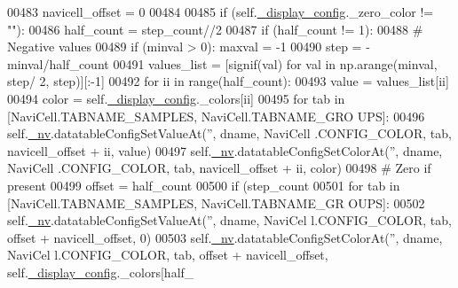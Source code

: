 \begin{DoxyCode}
00483                 navicell\_offset = 0
00484 
00485             \textcolor{keywordflow}{if} (self.\hyperlink{classnavicom_1_1navicom_1_1NaviCom_ab8ddca454f674629472d8bfec46ac76f}{_display_config}.\_zero\_color != \textcolor{stringliteral}{""}):
00486                 half\_count = step\_count//2
00487                 \textcolor{keywordflow}{if} (half\_count != 1):
00488                     \textcolor{comment}{# Negative values}
00489                     \textcolor{keywordflow}{if} (minval > 0): maxval = -1
00490                     step = -minval/half\_count
00491                     values\_list = [signif(val) \textcolor{keywordflow}{for} val \textcolor{keywordflow}{in} np.arange(minval, step/
      2, step)][:-1]
00492                     \textcolor{keywordflow}{for} ii \textcolor{keywordflow}{in} range(half\_count):
00493                        value = values\_list[ii]
00494                        color = self.\hyperlink{classnavicom_1_1navicom_1_1NaviCom_ab8ddca454f674629472d8bfec46ac76f}{_display_config}.\_colors[ii]
00495                        \textcolor{keywordflow}{for} tab \textcolor{keywordflow}{in} [NaviCell.TABNAME\_SAMPLES, NaviCell.TABNAME\_GRO
      UPS]:
00496                            self.\hyperlink{classnavicom_1_1navicom_1_1NaviCom_afff3fd56fa16a68bab52ba8d801e325a}{_nv}.datatableConfigSetValueAt(\textcolor{stringliteral}{''}, dname, NaviCell
      .CONFIG\_COLOR, tab, navicell\_offset + ii, value)
00497                            self.\hyperlink{classnavicom_1_1navicom_1_1NaviCom_afff3fd56fa16a68bab52ba8d801e325a}{_nv}.datatableConfigSetColorAt(\textcolor{stringliteral}{''}, dname, NaviCell
      .CONFIG\_COLOR, tab, navicell\_offset + ii, color)
00498                     \textcolor{comment}{# Zero if present}
00499                     offset = half\_count
00500                     \textcolor{keywordflow}{if} (step\_count%
00501                         \textcolor{keywordflow}{for} tab \textcolor{keywordflow}{in} [NaviCell.TABNAME\_SAMPLES, NaviCell.TABNAME\_GR
      OUPS]:
00502                             self.\hyperlink{classnavicom_1_1navicom_1_1NaviCom_afff3fd56fa16a68bab52ba8d801e325a}{_nv}.datatableConfigSetValueAt(\textcolor{stringliteral}{''}, dname, NaviCel
      l.CONFIG\_COLOR, tab, offset + navicell\_offset, 0)
00503                             self.\hyperlink{classnavicom_1_1navicom_1_1NaviCom_afff3fd56fa16a68bab52ba8d801e325a}{_nv}.datatableConfigSetColorAt(\textcolor{stringliteral}{''}, dname, NaviCel
      l.CONFIG\_COLOR, tab, offset + navicell\_offset, self.\hyperlink{classnavicom_1_1navicom_1_1NaviCom_ab8ddca454f674629472d8bfec46ac76f}{_display_config}.\_colors[half\_

\end{DoxyCode}
